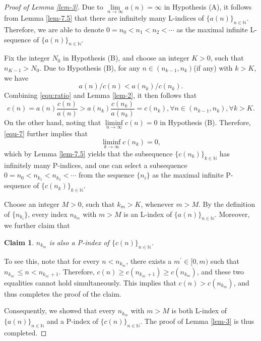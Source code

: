 \documentclass[12pt,reqno]{amsart}
\renewcommand{\=}{\coloneqq}
\theoremstyle{plain}
\newtheorem*{claim}{Claim}
\begin{document}
\begin{proof}[Proof of Lemma \ref{lem-3}]
Due to $\lim\limits_{n\to\infty}a(n)=\infty$ in Hypothesis (A), it follows from Lemma \ref{lem-7.5} that there are infinitely many L-indices of $\{a(n)\}_{n\in
\mathbb{N}}$. Therefore, we are able to denote $0=n_{0}<n_1<n_2<\cdots$ as the maximal infinite L-sequence of $\{a(n)\}_{n\in\mathbb{N}}$.

Fix the integer $N_{0}$ in Hypothesis (B), and choose an integer $K>0$, such that $n_{K-1}>N_0$. Due to Hypothesis (B),  for any $n \in (n_{k-1}, n_k)$(if any) with $k>K$, we have
\begin{equation}\label{equ:ratio}
a(n)/c(n) < a(n_k)/c(n_k).
\end{equation}
Combining \eqref{equ:ratio} and Lemma \ref{lem-2}, it then follows that
\begin{equation}\label{equ-7}
c(n) = a(n)\frac{c(n)}{a(n)} > a(n_k)\frac{c(n_k)}{a(n_k)} = c(n_k), \forall n\in (n_{k-1}, n_k), \forall k>K.
\end{equation}
On the other hand, noting that $\liminf\limits_{n\to\infty} c(n) = 0$ in Hypothesis (B). Therefore, \eqref{equ-7} further implies that
\begin{equation}\label{equ:subsequence}
\liminf\limits_{k\to \infty} c(n_k) = 0,
\end{equation}
which by Lemma \ref{lem-7.5} yields that the subsequence $\{c(n_k)\}_{k\in\mathbb{N}}$ has infinitely many P-indices, and one can select a subsequence $0=n_{0}<n_{k_1}<n_{k_2}<\cdots$ from the sequence $\{n_{i}\}$ as the maximal infinite P-sequence of $\{c(n_{k})\}_{k\in\mathbb{N}}$.
			
Choose an integer $M>0$, such that $k_m>K$, whenever $m>M$. By the definition of $\{n_{k_i}\}$, every index $n_{k_m}$ with $m>M$ is an L-index of $\{a(n)\}_{n\in\mathbb{N}}$. Moreover, we further claim that
\begin{claim}
$n_{k_m}$ is also a P-index of $\{c(n)\}_{n\in\mathbb{N}}$.
\end{claim}
To see this, note that for every $n<n_{k_m}$, there exists a $m^\prime \in [0,m)$ such that $n_{k_{m^\prime}} \leq n < n_{k_{m^\prime}+1}$. Therefore,
$c(n)\geq c(n_{k_{m^\prime}+1}) \geq c(n_{k_m})$, and these two equalities cannot hold simultaneously. This implies that $c(n)>c(n_{k_m})$, and thus completes the proof of the claim.
			
Consequently, we showed that every $n_{k_m}$ with $m>M$ is both L-index of $\{a(n)\}_{n\in\mathbb{N}}$ and a P-index of $\{c(n)\}_{n\in\mathbb{N}}$. The proof of Lemma \ref{lem-3} is thus completed.
\end{proof}
\end{document}
